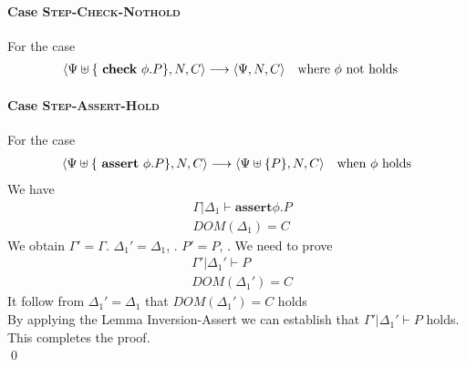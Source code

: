 \documentclass[master,english]{kuisthesis}
\theoremstyle{definition}
\begin{document}
\paragraph{Case \textsc{Step-Check-Nothold}} For the case
\begin{align*}
\langle\Psi \uplus\{\text { \textbf{check} } \phi . P\}, N, C\rangle &\longrightarrow \langle\Psi, N, C\rangle \quad \text{where $\phi$ not holds} 
\end{align*}\noindent


\paragraph{Case \textsc{Step-Assert-Hold}} For the case
\begin{align*}
\langle\Psi \uplus\{\text { \textbf{assert} } \phi . P\} , N, C\rangle&\longrightarrow \langle\Psi \uplus\{P\}, N, C\rangle \quad \text{when $\phi$ holds} \\
\end{align*}\noindent
We have
\begin{align}
&\Gamma | \Delta_1 \vdash {\textbf{assert} } \phi . P
    \\&DOM(\Delta_1) = C 
\end{align}\noindent
We obtain $\Gamma' = \Gamma$. $\Delta_1' = \Delta_1 $, . $P' = P$, . We need to prove
\begin{align*}
    &\Gamma' | \Delta_1' \vdash P
    \\&DOM(\Delta_1') = C 
\end{align*}\noindent
It follow from $\Delta_1' = \Delta_1 $ that  $DOM(\Delta_1') = C $ holds
\\By applying the {Lemma Inversion-Assert}  we can establish that  $ \Gamma' | \Delta_1' \vdash P $ holds. This completes the proof.\\
\qed
\end{document}

